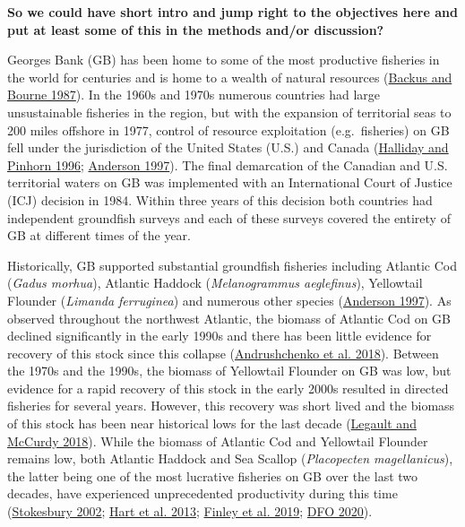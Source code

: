 \documentclass[
]{article}
\begin{document}
\textbf{So we could have short intro and jump right to the objectives here and put at least some of this in the methods and/or discussion?}

Georges Bank (GB) has been home to some of the most productive fisheries in the world for centuries and is home to a wealth of natural resources (\protect\hyperlink{ref-backusGeorgesBank1987}{Backus and Bourne 1987}). In the 1960s and 1970s numerous countries had large unsustainable fisheries in the region, but with the expansion of territorial seas to 200 miles offshore in 1977, control of resource exploitation (e.g.~fisheries) on GB fell under the jurisdiction of the United States (U.S.) and Canada (\protect\hyperlink{ref-hallidayNorthAtlanticFishery1996}{Halliday and Pinhorn 1996}; \protect\hyperlink{ref-andersonHistoryFisheriesManagement1997}{Anderson 1997}). The final demarcation of the Canadian and U.S. territorial waters on GB was implemented with an International Court of Justice (ICJ) decision in 1984. Within three years of this decision both countries had independent groundfish surveys and each of these surveys covered the entirety of GB at different times of the year.

Historically, GB supported substantial groundfish fisheries including Atlantic Cod (\emph{Gadus morhua}), Atlantic Haddock (\emph{Melanogrammus aeglefinus}), Yellowtail Flounder (\emph{Limanda ferruginea}) and numerous other species (\protect\hyperlink{ref-andersonHistoryFisheriesManagement1997}{Anderson 1997}). As observed throughout the northwest Atlantic, the biomass of Atlantic Cod on GB declined significantly in the early 1990s and there has been little evidence for recovery of this stock since this collapse (\protect\hyperlink{ref-andrushchenkoAssessmentEasternGeorges2018}{Andrushchenko et al. 2018}). Between the 1970s and the 1990s, the biomass of Yellowtail Flounder on GB was low, but evidence for a rapid recovery of this stock in the early 2000s resulted in directed fisheries for several years. However, this recovery was short lived and the biomass of this stock has been near historical lows for the last decade (\protect\hyperlink{ref-legaultStockAssessmentGeorges2018}{Legault and McCurdy 2018}). While the biomass of Atlantic Cod and Yellowtail Flounder remains low, both Atlantic Haddock and Sea Scallop (\emph{Placopecten magellanicus}), the latter being one of the most lucrative fisheries on GB over the last two decades, have experienced unprecedented productivity during this time (\protect\hyperlink{ref-stokesburyEstimationSeaScallop2002}{Stokesbury 2002}; \protect\hyperlink{ref-hartSplitNotSplit2013}{Hart et al. 2013}; \protect\hyperlink{ref-finleyAssessmentHaddockEastern2019}{Finley et al. 2019}; \protect\hyperlink{ref-dfoStockStatusUpdate2019a}{DFO 2020}).
\end{document}
